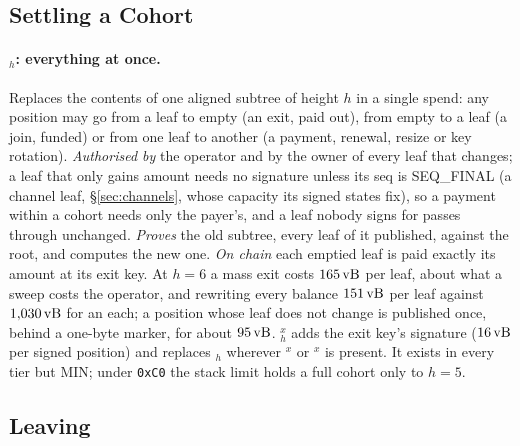 \subsection{Settling a Cohort}

\paragraph{$_h$: everything at once.} Replaces the contents
of one aligned subtree of height $h$ in a single spend: any position may
go from a leaf to empty (an exit, paid out), from empty to a leaf (a
join, funded) or from one leaf to another (a payment, renewal, resize or
key rotation). \emph{Authorised by} the operator and by the owner of
every leaf that changes; a leaf that only gains amount needs no
signature unless its \textsf{seq} is \textsf{SEQ\_FINAL} (a channel leaf,
\S\ref{sec:channels}, whose capacity its signed states fix), so a payment
within a cohort needs only the payer's, and a leaf nobody signs for passes
through unchanged. \emph{Proves} the old
subtree, every leaf of it published, against the root, and computes the
new one. \emph{On chain} each emptied leaf is paid exactly its amount at
its exit key. At $h = 6$ a mass exit
costs $165\,\mathrm{vB}$ per leaf, about what a sweep costs the operator, and
rewriting every balance $151\,\mathrm{vB}$ per leaf against $1{,}030\,\mathrm{vB}$ for an
 each; a position whose leaf does not change is published
once, behind a one-byte marker, for about $95\,\mathrm{vB}$. $_h^{x}$ adds the exit key's signature
($16\,\mathrm{vB}$ per signed position) and replaces $_h$ wherever
$^{x}$ or $^{x}$ is present. It exists in every
tier but MIN; under \texttt{0xC0} the stack limit holds a full cohort
only to $h = 5$.

\subsection{Leaving}

